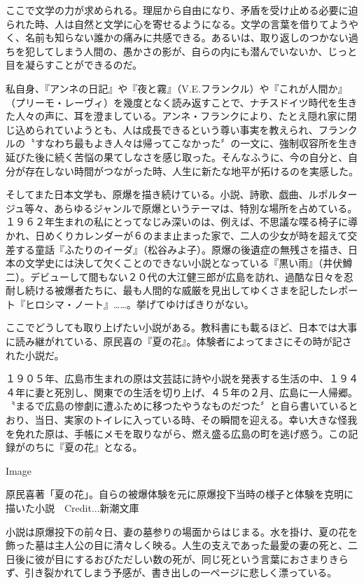 ここで文学の力が求められる。理屈から自由になり、矛盾を受け止める必要に迫られた時、人は自然と文学に心を寄せるようになる。文学の言葉を借りてようやく、名前も知らない誰かの痛みに共感できる。あるいは、取り返しのつかない過ちを犯してしまう人間の、愚かさの影が、自らの内にも潜んでいないか、じっと目を凝らすことができるのだ。

私自身、『アンネの日記』や『夜と霧』（V.E.フランクル）や『これが人間か』（プリーモ・レーヴィ）を幾度となく読み返すことで、ナチスドイツ時代を生きた人々の声に、耳を澄ましている。アンネ・フランクにより、たとえ隠れ家に閉じ込められていようとも、人は成長できるという尊い事実を教えられ、フランクルの〝すなわち最もよき人々は帰ってこなかった〞の一文に、強制収容所を生き延びた後に続く苦悩の果てしなさを感じ取った。そんなふうに、今の自分と、自分が存在しない時間がつながった時、人生に新たな地平が拓けるのを実感した。

そしてまた日本文学も、原爆を描き続けている。小説、詩歌、戯曲、ルポルタージュ等々、あらゆるジャンルで原爆というテーマは、特別な場所を占めている。１９６２年生まれの私にとってなじみ深いのは、例えば、不思議な喋る椅子に導かれ、日めくりカレンダーが６のまま止まった家で、二人の少女が時を超えて交差する童話『ふたりのイーダ』（松谷みよ子）。原爆の後遺症の無残さを描き、日本の文学史には決して欠くことのできない小説となっている『黒い雨』（井伏鱒二）。デビューして間もない２０代の大江健三郎が広島を訪れ、過酷な日々を忍耐し続ける被爆者たちに、最も人間的な威厳を見出してゆくさまを記したレポート『ヒロシマ・ノート』\ldots\ldots。挙げてゆけばきりがない。

ここでどうしても取り上げたい小説がある。教科書にも載るほど、日本では大事に読み継がれている、原民喜の『夏の花』。体験者によってまさにその時が記された小説だ。

１９０５年、広島市生まれの原は文芸誌に詩や小説を発表する生活の中、１９４４年に妻と死別し、関東での生活を切り上げ、４５年の２月、広島に一人帰郷。〝まるで広島の惨劇に遭ふために移つたやうなものだつた〞と自ら書いているとおり、当日、実家のトイレに入っている時、その瞬間を迎える。幸い大きな怪我を免れた原は、手帳にメモを取りながら、燃え盛る広島の町を逃げ惑う。この記録がのちに『夏の花』となる。

Image

原民喜著「夏の花」。自らの被爆体験を元に原爆投下当時の様子と体験を克明に描いた小説　Credit...新潮文庫

小説は原爆投下の前々日、妻の墓参りの場面からはじまる。水を掛け、夏の花を飾った墓は主人公の目に清々しく映る。人生の支えであった最愛の妻の死と、二日後に彼が目にするおびただしい数の死が、同じ死という言葉におさまりきらず、引き裂かれてしまう予感が、書き出しの一ページに悲しく漂っている。

